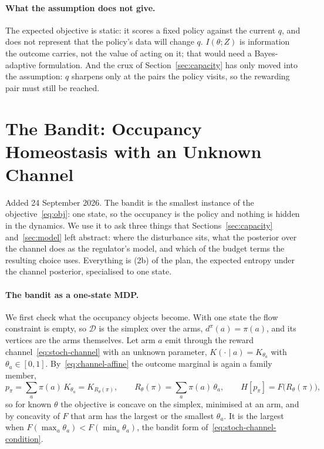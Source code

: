 \documentclass[11pt]{article}
\theoremstyle{remark}
\newcommand{\Dcal}{\mathcal D}
\newcommand{\1}{\mathds{1}}
\newcommand{\occ}{d^{\pi}}
\newcommand{\pz}{p_{\pi}}
\newcommand{\Hf}[1]{H\!\left[#1\right]}
\begin{document}
\paragraph{What the assumption does not give.}
The expected objective is static: it scores a fixed policy against the current $q$, and does not represent that the policy's data will change $q$.
$I(\theta;Z)$ is information the outcome carries, not the value of acting on it; that would need a Bayes-adaptive formulation.
And the crux of Section~\ref{sec:capacity} has only moved into the assumption: $q$ sharpens only at the pairs the policy visits, so the rewarding pair must still be reached.

\section{The Bandit: Occupancy Homeostasis with an Unknown Channel}
\label{sec:bandit}
Added 24 September 2026.
The bandit is the smallest instance of the objective~\eqref{eq:obj}: one state, so the occupancy is the policy and nothing is hidden in the dynamics.
We use it to ask three things that Sections~\ref{sec:capacity} and~\ref{sec:model} left abstract: where the disturbance sits, what the posterior over the channel does as the regulator's model, and which of the budget terms the resulting choice uses.
Everything is (2b) of the plan, the expected entropy under the channel posterior, specialised to one state.

\paragraph{The bandit as a one-state MDP.}
We first check what the occupancy objects become.
With one state the flow constraint is empty, so $\Dcal$ is the simplex over the arms, $\occ(a)=\pi(a)$, and its vertices are the arms themselves.
Let arm $a$ emit through the reward channel~\eqref{eq:stoch-channel} with an unknown parameter, $K(\cdot\mid a)=K_{\theta_a}$ with $\theta_a\in[0,1]$.
By~\eqref{eq:channel-affine} the outcome marginal is again a family member,
\begin{equation}
  \pz=\sum_a\pi(a)\,K_{\theta_a}=K_{R_\theta(\pi)},
  \qquad
  R_\theta(\pi)=\sum_a\pi(a)\,\theta_a,
  \qquad
  \Hf{\pz}=F\big(R_\theta(\pi)\big),
  \label{eq:bandit-obj}
\end{equation}
so for known $\theta$ the objective is concave on the simplex, minimised at an arm, and by concavity of $F$ that arm has the largest or the smallest $\theta_a$.
It is the largest when $F(\max_a\theta_a)<F(\min_a\theta_a)$, the bandit form of~\eqref{eq:stoch-channel-condition}.
\end{document}
